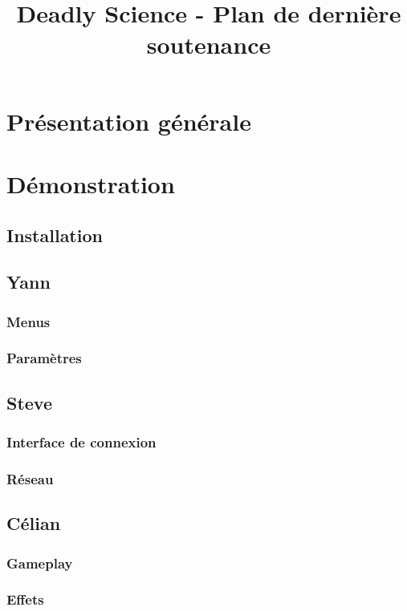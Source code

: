 \documentclass{article}
\title{Deadly Science - Plan de dernière soutenance}
\begin{document}
\maketitle

\section{Présentation générale}

\section{Démonstration}

\subsection{Installation}

\subsection{Yann}
\subsubsection{Menus}
\subsubsection{Paramètres}

\subsection{Steve}
\subsubsection{Interface de connexion}
\subsubsection{Réseau}

\subsection{Célian}
\subsubsection{Gameplay}
\subsubsection{Effets}
\end{document}
